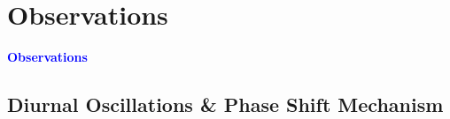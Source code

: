 \documentclass[8pt, aspectratio=169]{beamer}
\begin{document}
\section{Observations}
\begin{frame}
    \begin{center}
        \Huge \textcolor{blue}{\textbf{Observations}} \\
    \end{center}
\end{frame}

\subsection{Diurnal Oscillations \& Phase Shift Mechanism}

\end{document}
